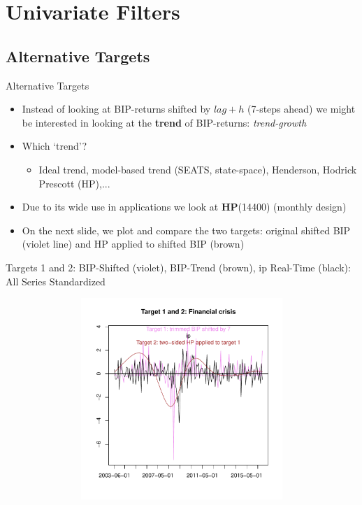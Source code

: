 \documentclass{beamer}
\begin{document}
\section{Univariate Filters}

\frame{\sectionpage}


\subsection{Alternative Targets}


\begin{frame} {Alternative Targets}
\begin{itemize}
\item Instead of looking at BIP-returns shifted by $lag+h$ (7-steps ahead) we might be interested in looking at the \textbf{trend} of BIP-returns: \emph{trend-growth}
\item Which `trend'?
\begin{itemize}
\item Ideal trend, model-based trend (SEATS, state-space), Henderson, Hodrick Prescott (HP),...
\end{itemize}
\item Due to its wide use in applications we look at \textbf{HP}(14400) (monthly design)
\item On the next slide, we plot and compare the two targets: original shifted BIP (violet line) and HP applied to shifted BIP (brown)
\end{itemize}
\end{frame}




\begin{frame} {Targets 1 and 2: BIP-Shifted (violet), BIP-Trend (brown), ip Real-Time (black): All Series Standardized }
\begin{figure}[H]\begin{center}\includegraphics[height=3in, width=4.5in]{alternative_targets_1.pdf}\caption{\label{data}}\end{center}\end{figure}\end{frame}
\end{document}
